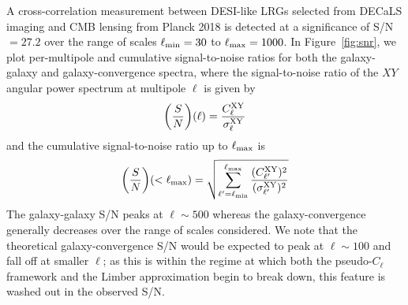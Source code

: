 A cross-correlation measurement between DESI-like LRGs selected from DECaLS imaging and CMB lensing from Planck 2018 is detected at a significance of S/N $= 27.2$ over the range of scales $\ell_{\rm min}=30$ to $\ell_{\rm max}=1000$. In Figure~\ref{fig:snr}, we plot per-multipole and cumulative signal-to-noise ratios for both the galaxy-galaxy and galaxy-convergence spectra, where the signal-to-noise ratio of the $XY$ angular power spectrum at multipole $\ell$ is given by
\begin{equation}
    {\bigg (} \frac{S}{N}{\bigg )}(\ell) = \frac{C_{\ell}^{\rm XY}}{\sigma_{\ell}^{\rm XY}}
\end{equation}
and the cumulative signal-to-noise ratio up to $\ell_{\rm max}$ is
\begin{equation}
    {\bigg (} \frac{S}{N}{\bigg )}(< \ell_{\rm max}) = \sqrt{\sum_{\ell^{\prime}=\ell_{\rm min}}^{\ell_{\rm max}}\frac{(C_{\ell^{\prime}}^{\rm XY})^2}{(\sigma_{\ell^{\prime}}^{\rm XY})^2}}
\end{equation}
The galaxy-galaxy S/N peaks at $\ell \sim 500$ whereas the galaxy-convergence generally decreases over the range of scales considered. We note that the theoretical galaxy-convergence S/N would be expected to peak at $\ell \sim 100$ and fall off at smaller $\ell$; as this is within the regime at which both the pseudo-$C_{\ell}$ framework and the Limber approximation begin to break down, this feature is washed out in the observed S/N.


